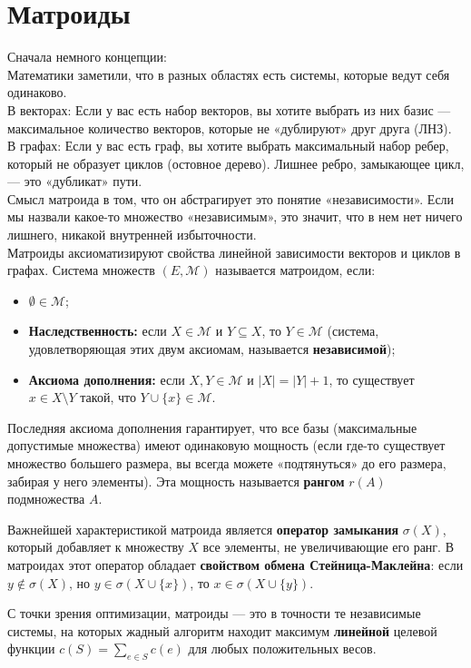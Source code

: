 \section{Матроиды}
Сначала немного концепции: \\
Математики заметили, что в разных областях есть системы, которые ведут себя одинаково. \\
В векторах: Если у вас есть набор векторов, вы хотите выбрать из них базис — максимальное количество векторов, которые не «дублируют» друг друга (ЛНЗ). \\
В графах: Если у вас есть граф, вы хотите выбрать максимальный набор ребер, который не образует циклов (остовное дерево). Лишнее ребро, замыкающее цикл, — это «дубликат» пути. \\
Смысл матроида в том, что он абстрагирует это понятие «независимости». Если мы назвали какое-то множество «независимым», это значит, что в нем нет ничего лишнего, никакой внутренней избыточности. \\
Матроиды аксиоматизируют свойства линейной зависимости векторов и циклов в графах. Система множеств $(E, \mathcal{M})$ называется матроидом, если:
\begin{itemize}
    \item $\emptyset \in \mathcal{M}$;
    \item \textbf{Наследственность:} если $X \in \mathcal{M}$ и $Y \subseteq X$, то $Y \in \mathcal{M}$ (система, удовлетворяющая этих двум аксиомам, называется \textbf{независимой});
    \item \textbf{Аксиома дополнения:} если $X, Y \in \mathcal{M}$ и $|X| = |Y| + 1$, то существует $x \in X \setminus Y$ такой, что $Y \cup \{x\} \in \mathcal{M}$.
\end{itemize}

Последняя аксиома дополнения гарантирует, что все базы (максимальные допустимые множества) имеют одинаковую мощность (если где-то существует множество большего размера, вы всегда можете «подтянуться» до его размера, забирая у него элементы). Эта мощность называется \textbf{рангом} $r(A)$ подмножества $A$.

Важнейшей характеристикой матроида является \textbf{оператор замыкания} $\sigma(X)$, который добавляет к множеству $X$ все элементы, не увеличивающие его ранг. В матроидах этот оператор обладает \textbf{свойством обмена Стейница-Маклейна}: если $y \notin \sigma(X)$, но $y \in \sigma(X \cup \{x\})$, то $x \in \sigma(X \cup \{y\})$. 

С точки зрения оптимизации, матроиды — это в точности те независимые системы, на которых жадный алгоритм находит максимум \textbf{линейной} целевой функции $c(S) = \sum_{e \in S} c(e)$ для любых положительных весов.

